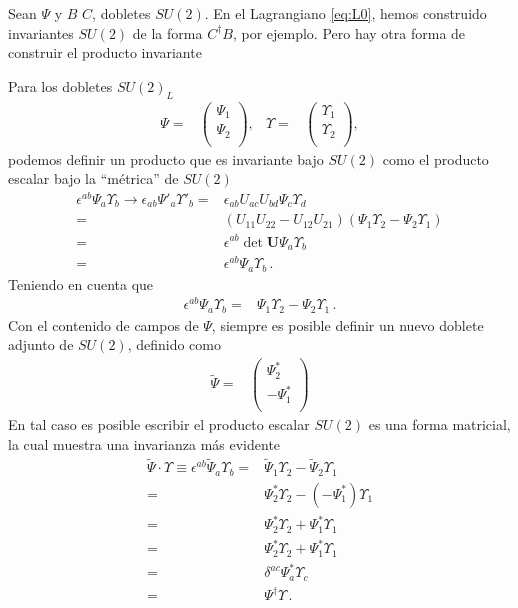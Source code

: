 \begin{frame}
  Sean $\Psi$ y $B$ $C$, dobletes $SU(2)$. En el Lagrangiano \eqref{eq:L0}, hemos construido invariantes $SU(2)$ de la forma $C^{\dagger}B$, por ejemplo. Pero hay otra forma de construir el producto invariante
  

Para los dobletes  $SU(2)_L$ 
\begin{align}
  \Psi=&
  \begin{pmatrix}
    \Psi_1\\
    \Psi_2\\
  \end{pmatrix},&
  \Upsilon=&
  \begin{pmatrix}
    \Upsilon_1\\
    \Upsilon_2\\
  \end{pmatrix},
\end{align}
podemos definir un producto que es invariante bajo $SU(2)$ como el producto escalar bajo la ``métrica'' de $SU(2)$
\begin{align}
\epsilon^{ab}\Psi_a \Upsilon_b\to \epsilon_{ab}\Psi'_a \Upsilon'_b=&\epsilon_{ab}U_{ac}U_{bd}\Psi_c \Upsilon_d\nonumber\\
  =&\left( U_{11}U_{22}-U_{12}U_{21} \right)\left(\Psi_1\Upsilon_2-\Psi_2\Upsilon_1  \right)\nonumber\\
  =&\epsilon^{ab}\det\mathbf{U} \Psi_a \Upsilon_b\nonumber\\
  =&\epsilon^{ab} \Psi_a \Upsilon_b\,.
\end{align}
Teniendo en cuenta que
\begin{align}
  \epsilon^{ab}\Psi_a \Upsilon_b=&\Psi_1 \Upsilon_2-\Psi_2 \Upsilon_1 \,.
 \end{align}
Con el contenido de campos de $\Psi$, siempre es posible definir un nuevo doblete adjunto de $SU(2)$, definido como 
\begin{align}
\label{eq:conjA}
 \widetilde{\Psi}=& \begin{pmatrix}
                  \Psi_2^{*}\\
                 -\Psi_1^{*}\\
                \end{pmatrix}
\end{align}
En tal caso es posible escribir el producto escalar $SU(2)$ es una forma matricial, la cual muestra una invarianza más evidente
\begin{align}
\widetilde{\Psi}\cdot \Upsilon\equiv \epsilon^{ab}\widetilde{\Psi}_a \Upsilon_b=&\widetilde{\Psi}_1 \Upsilon_2-\widetilde{\Psi}_2 \Upsilon_1 \nonumber\\
                     =&\Psi_2^{*}\Upsilon_2 -(-\Psi_1^{*}) \Upsilon_1 \nonumber\\
                     =&\Psi_2^{*}\Upsilon_2 +\Psi_1^{*} \Upsilon_1 \nonumber\\
                     =&\Psi_2^{*}\Upsilon_2 +\Psi_1^{*} \Upsilon_1 \nonumber\\
                     =&\delta^{ac}\Psi_a^{*}\Upsilon_c \nonumber\\
                     =&\Psi^{\dagger} \Upsilon\,.
 \end{align}


\end{frame}
